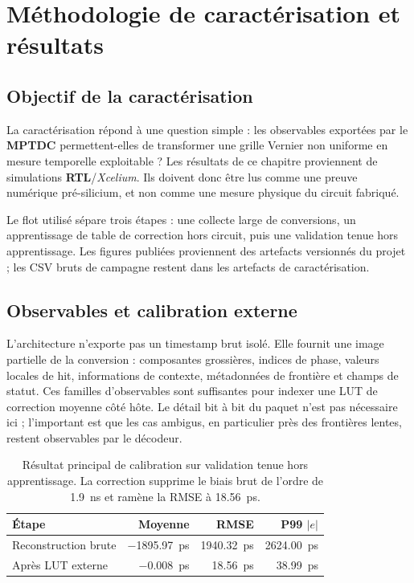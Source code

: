 \chapter{Méthodologie de caractérisation et résultats}
\label{chap:resultats-calibration}
\justifying
\sloppy

\section{Objectif de la caractérisation}

La caractérisation répond à une question simple : les observables exportées par le \textbf{MPTDC} permettent-elles de transformer une grille Vernier non uniforme en mesure temporelle exploitable ? Les résultats de ce chapitre proviennent de simulations \textbf{RTL}/\textit{Xcelium}. Ils doivent donc être lus comme une preuve numérique pré-silicium, et non comme une mesure physique du circuit fabriqué.

Le flot utilisé sépare trois étapes : une collecte large de conversions, un apprentissage de table de correction hors circuit, puis une validation tenue hors apprentissage. Les figures publiées proviennent des artefacts versionnés du projet ; les CSV bruts de campagne restent dans les artefacts de caractérisation.

\section{Observables et calibration externe}

L'architecture n'exporte pas un timestamp brut isolé. Elle fournit une image partielle de la conversion : composantes grossières, indices de phase, valeurs locales de hit, informations de contexte, métadonnées de frontière et champs de statut. Ces familles d'observables sont suffisantes pour indexer une LUT de correction moyenne côté hôte. Le détail bit à bit du paquet n'est pas nécessaire ici ; l'important est que les cas ambigus, en particulier près des frontières lentes, restent observables par le décodeur.

\begin{table}[H]
    \centering
    \small
    \begin{tabularx}{0.98\textwidth}{>{\raggedright\arraybackslash}Xrrr}
        \toprule
        \textbf{Étape} & \textbf{Moyenne} & \textbf{RMSE} & \textbf{P99 $|e|$} \\
        \midrule
        Reconstruction brute & \SI{-1895.97}{\pico\second} & \SI{1940.32}{\pico\second} & \SI{2624.00}{\pico\second} \\
        Après LUT externe & \SI{-0.008}{\pico\second} & \SI{18.56}{\pico\second} & \SI{38.99}{\pico\second} \\
        \bottomrule
    \end{tabularx}
    \caption{Résultat principal de calibration sur validation tenue hors apprentissage. La correction supprime le biais brut de l'ordre de \SI{1.9}{\nano\second} et ramène la RMSE à \SI{18.56}{\pico\second}.}
    \label{tab:calibration-pre-post}
\end{table}

